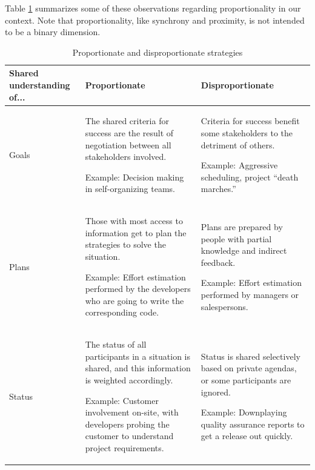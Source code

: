 Table \ref{tab:Proportionality} summarizes some of these observations regarding proportionality in our context. Note that proportionality, like synchrony and proximity, is not intended to be a binary dimension.

\begin{table}[tbp]
\caption{\label{tab:Proportionality} Proportionate and disproportionate strategies}
\centering
\footnotesize{\begin{tabular}{p{2.0cm}p{5.8cm}p{5.8cm}}
\hline \hline
\vspace{1pt} \bfseries Shared understanding of... & \vspace{1pt} \bfseries Proportionate & \vspace{1pt} \bfseries Disproportionate \\
\hline
\vspace{0.5pt} Goals & \vspace{0.5pt} The shared criteria for success are the result of negotiation between all stakeholders involved. \par Example: Decision making in self-organizing teams. & \vspace{0.5pt} Criteria for success benefit some stakeholders to the detriment of others. \par Example: Aggressive scheduling, project ``death marches.''\\
\hline
\vspace{0.5pt} Plans & \vspace{0.5pt} Those with most access to information get to plan the strategies to solve the situation. \par Example: Effort estimation performed by the developers who are going to write the corresponding code. & \vspace{0.5pt} Plans are prepared by people with partial knowledge and indirect feedback. \par Example: Effort estimation performed by managers or salespersons.\\
\hline
\vspace{0.5pt} Status & \vspace{0.5pt} The status of all participants in a situation is shared, and this information is weighted accordingly. \par Example: Customer involvement on-site, with developers probing the customer to understand project requirements. & \vspace{0.5pt} Status is shared selectively based on private agendas, or some participants are ignored. \par Example: Downplaying quality assurance reports to get a release out quickly.\\

\end{tabular}}
\end{table}

